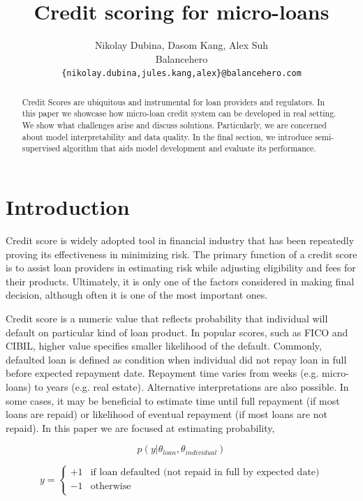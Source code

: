 \documentclass{article}
\title{Credit scoring for micro-loans}
\author{
    Nikolay Dubina, Dasom Kang, Alex Suh\\
    Balancehero\\
    \texttt{\{nikolay.dubina,jules.kang,alex\}@balancehero.com}
}
\begin{document}
\maketitle

\begin{abstract}
    Credit Scores are ubiquitous and instrumental for loan providers and regulators. In this paper we showcase how micro-loan credit system can be developed in real setting. We show what challenges arise and discuss solutions. Particularly, we are concerned about model interpretability and data quality. In the final section, we introduce semi-supervised algorithm that aids model development and evaluate its performance.
\end{abstract}


\section{Introduction}
Credit score is widely adopted tool in financial industry that has been repeatedly proving its effectiveness in minimizing risk. The primary function of a credit score is to assist loan providers in estimating risk while adjusting eligibility and fees for their products. Ultimately, it is only one of the factors considered in making final decision, although often it is one of the most important ones.

Credit score is a numeric value that reflects probability that individual will default on particular kind of loan product. In popular scores, such as FICO and CIBIL, higher value specifies smaller likelihood of the default. Commonly, defaulted loan is defined as condition when individual did not repay loan in full before expected repayment date. Repayment time varies from weeks (e.g. micro-loans) to years (e.g. real estate). Alternative interpretations are also possible. In some cases, it may be beneficial to estimate time until full repayment (if most loans are repaid) or likelihood of eventual repayment (if most loans are not repaid). In this paper we are focused at estimating probability,

$$
    p(y|\theta_{loan}, \theta_{individual})
$$

$$
y = 
\begin{cases}
    +1  & \text{if loan defaulted (not repaid in full by expected date)} \\
    -1  & \text{otherwise} \\
\end{cases}
$$
\end{document}
